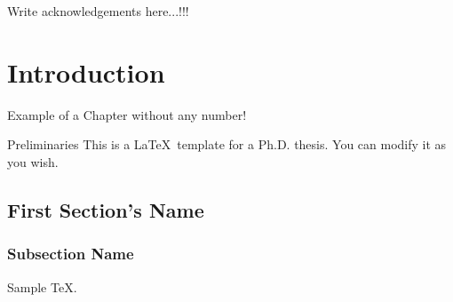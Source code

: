 \documentclass[11pt,english,
onehalfspacing,
headsepline]{thesis}
\numberwithin{equation}{subsection}
\theoremstyle{definition}
\begin{document}

\begin{acknowledgements}
Write acknowledgements here...!!! 

\end{acknowledgements}



\cleardoublepage %
\tableofcontents %


\mainmatter %

\pagestyle{thesis}

\setcounter{chapter}{0}
\chapter*{\centering Introduction} %
Example of a Chapter without any number! 


\begin{chapter}{Preliminaries}\label{ch-1}
This is a \LaTeX\ template for a Ph.D. thesis. You can modify it as you wish. 

\section{First Section's Name}\label{sec-1.1}
\subsection{Subsection Name}
Sample \TeX. 

\end{chapter} %
\end{document}
